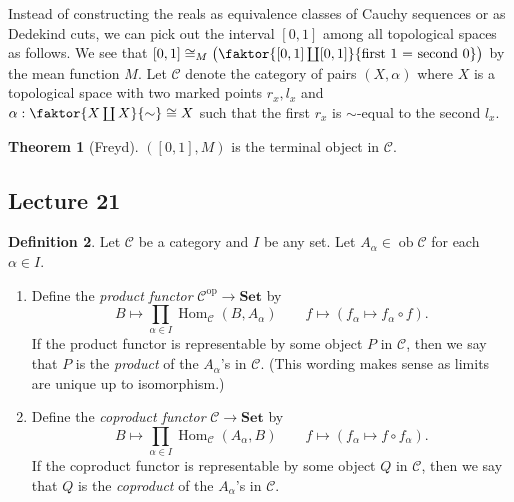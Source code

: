 \documentclass[10pt,letterpaper,cm]{nupset}
\theoremstyle{definition}
\newtheorem{definition}{Definition}[subsection]
\theoremstyle{theorem}
\newtheorem{theorem}[definition]{Theorem}
\theoremstyle{remark}
\newcommand{\1}{\mathbf{1}}
\renewcommand{\c}{\mathscr{C}}
\newcommand{\0}{\vec 0}
\DeclareMathOperator{\op}{op}
\DeclareMathOperator{\ob}{ob}
\DeclareMathOperator{\Hom}{Hom}
\begin{document}
 Instead of constructing the reals as equivalence classes of Cauchy sequences or as Dedekind cuts, we can pick out the interval $[0,1]$ among all topological spaces as follows. We see that $[0,1]\cong_M \big ( \faktor{[0,1] \coprod [0,1]}{\text{first 1 = second 0}} \big )$ by the mean function $M$. Let $\c$ denote the category of pairs $(X, \alpha)$ where $X$ is a topological space with two marked points $r_x, l_x$ and $\alpha :  \faktor{X \coprod X}{\sim} \cong X$ such that the first $r_x$ is $\sim$-equal to the second $l_x$.
 
\begin{theorem}[Freyd]
$([0,1], M)$ is the terminal object in $\c$.
\end{theorem}

\subsection{Lecture 21}

\begin{definition} Let $\c$ be a category and $I$ be any set. Let $A_{\alpha} \in \ob \c$ for each $\alpha \in I$.
\begin{enumerate}
\item  Define the \textit{product functor} $\c^{\op} \to \mathbf{Set}$ by $$B \mapsto \prod_{\alpha \in I}\Hom_{\c}(B, A_{\alpha}) \quad \quad f \mapsto (f_{\alpha} \mapsto f_{\alpha} \circ f).$$ If the product functor is representable by some object $P$ in $\c$, then we say that $P$ is the \textit{product} of the $A_{\alpha}$'s in $\c$. (This wording makes sense as limits are unique up to isomorphism.)
\item Define the \textit{coproduct functor} $\c \to \mathbf{Set}$ by $$ B \mapsto \prod_{\alpha \in I} \Hom_{\c}(A_{\alpha}, B) \quad \quad f \mapsto (f_{\alpha} \mapsto f \circ f_{\alpha}).$$ If the coproduct functor is representable by some object $Q$ in $\c$, then we say that $Q$ is the \textit{coproduct} of the $A_{\alpha}$'s in $\c$.
\end{enumerate}
\end{definition}
\end{document}
